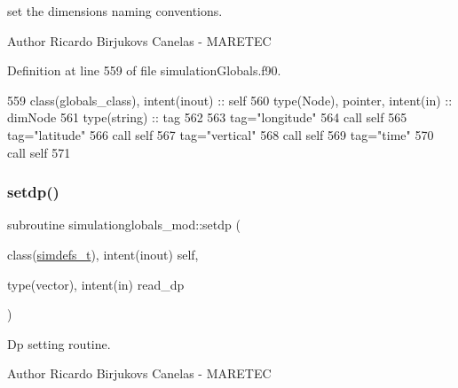 set the dimensions naming conventions. 

\begin{DoxyAuthor}{Author}
Ricardo Birjukovs Canelas -\/ M\+A\+R\+E\+T\+EC 
\end{DoxyAuthor}


Definition at line 559 of file simulation\+Globals.\+f90.


\begin{DoxyCode}
559     \textcolor{keywordtype}{class}(globals\_class), \textcolor{keywordtype}{intent(inout)} :: self
560     \textcolor{keywordtype}{type}(Node), \textcolor{keywordtype}{pointer}, \textcolor{keywordtype}{intent(in)} :: dimNode
561     \textcolor{keywordtype}{type}(string) :: tag
562 
563     tag=\textcolor{stringliteral}{"longitude"}
564     \textcolor{keyword}{call }self%
565     tag=\textcolor{stringliteral}{"latitude"}
566     \textcolor{keyword}{call }self%
567     tag=\textcolor{stringliteral}{"vertical"}
568     \textcolor{keyword}{call }self%
569     tag=\textcolor{stringliteral}{"time"}
570     \textcolor{keyword}{call }self%
571 
\end{DoxyCode}
\mbox{\label{namespacesimulationglobals__mod_afda1e73e6e0cd075875c70aded99d425}} 
\subsubsection{\texorpdfstring{setdp()}{setdp()}}
{\footnotesize\ttfamily subroutine simulationglobals\+\_\+mod\+::setdp (\begin{DoxyParamCaption}\item[{class(\mbox{\hyperlink{structsimulationglobals__mod_1_1simdefs__t}{simdefs\+\_\+t}}), intent(inout)}]{self,  }\item[{type(vector), intent(in)}]{read\+\_\+dp }\end{DoxyParamCaption})\hspace{0.3cm}{\ttfamily [private]}}



Dp setting routine. 

\begin{DoxyAuthor}{Author}
Ricardo Birjukovs Canelas -\/ M\+A\+R\+E\+T\+EC 
\end{DoxyAuthor}

